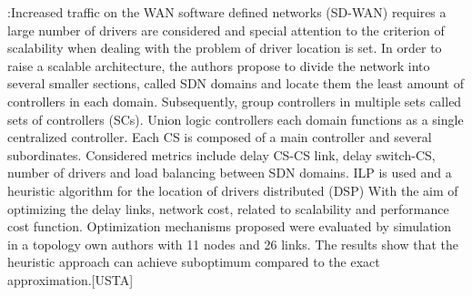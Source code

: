 \documentclass[a4paper,10pt]{article}
\begin{document}
\cite{ZhWu17}:Increased traffic on the WAN software defined networks (SD-WAN) requires a large number of drivers are considered and special attention to the criterion of scalability when dealing with the problem of driver location is set. In order to raise a scalable architecture, the authors propose to divide the network into several smaller sections, called SDN domains and locate them the least amount of controllers in each domain. Subsequently, group controllers in multiple sets called sets of controllers (SCs). Union logic controllers each domain functions as a single centralized controller. Each CS is composed of a main controller and several subordinates.
Considered metrics include delay CS-CS link, delay switch-CS, number of drivers and load balancing between SDN domains. ILP is used and a heuristic algorithm for the location of drivers distributed (DSP) With the aim of optimizing the delay links, network cost, related to scalability and performance cost function. Optimization mechanisms proposed were evaluated by simulation in a topology own authors with 11 nodes and 26 links. The results show that the heuristic approach can achieve suboptimum compared to the exact approximation.[USTA]
\end{document}
